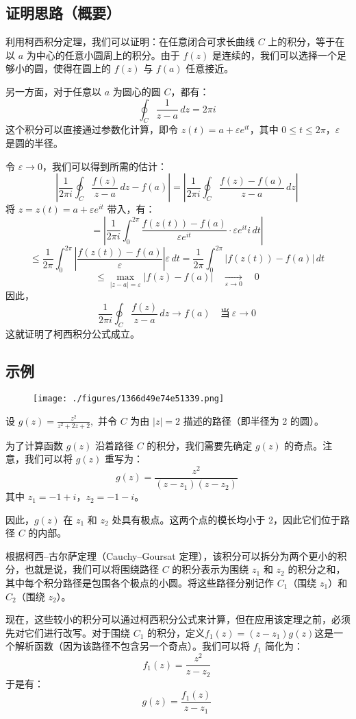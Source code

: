 \subsection{证明思路（概要）}
利用柯西积分定理，我们可以证明：在任意闭合可求长曲线 $C$ 上的积分，等于在以 $a$ 为中心的任意小圆周上的积分。由于 $f(z)$ 是连续的，我们可以选择一个足够小的圆，使得在圆上的 $f(z)$ 与 $f(a)$ 任意接近。

另一方面，对于任意以 $a$ 为圆心的圆 $C$，都有：
$$
\oint_{C} \frac{1}{z - a} \, dz = 2\pi i~
$$
这个积分可以直接通过参数化计算，即令 $z(t) = a + \varepsilon e^{it}$，其中 $0 \leq t \leq 2\pi$，$\varepsilon$ 是圆的半径。

令 $\varepsilon \to 0$，我们可以得到所需的估计：
$$
\left| \frac{1}{2\pi i} \oint_{C} \frac{f(z)}{z - a} \, dz - f(a) \right|
= \left| \frac{1}{2\pi i} \oint_{C} \frac{f(z) - f(a)}{z - a} \, dz \right|~
$$
将 $z = z(t) = a + \varepsilon e^{it}$ 带入，有：
$$
= \left| \frac{1}{2\pi i} \int_0^{2\pi} \frac{f(z(t)) - f(a)}{\varepsilon e^{it}} \cdot \varepsilon e^{it} i \, dt \right|~
$$
$$
\leq \frac{1}{2\pi} \int_0^{2\pi} \left| \frac{f(z(t)) - f(a)}{\varepsilon} \right| \varepsilon \, dt
= \frac{1}{2\pi} \int_0^{2\pi} |f(z(t)) - f(a)| \, dt~
$$
$$
\leq \max_{|z - a| = \varepsilon} |f(z) - f(a)| \quad \xrightarrow[\varepsilon \to 0]{} \quad 0~
$$
因此，
$$
\frac{1}{2\pi i} \oint_{C} \frac{f(z)}{z - a} \, dz \to f(a) \quad \text{当}~ \varepsilon \to 0~
$$
这就证明了柯西积分公式成立。
\subsection{示例}
\begin{figure}[ht]
\centering
\texttt{[image: ./figures/1366d49e74e51339.png]}
\caption{} \label{fig_KXjfgs_1}
\end{figure}
设
$g(z) = \frac{z^2}{z^2 + 2z + 2},$
并令 $C$ 为由 $|z| = 2$ 描述的路径（即半径为 2 的圆）。

为了计算函数 $g(z)$ 沿着路径 $C$ 的积分，我们需要先确定 $g(z)$ 的奇点。注意，我们可以将 $g(z)$ 重写为：
$$
g(z) = \frac{z^2}{(z - z_1)(z - z_2)}~
$$
其中 $z_1 = -1 + i$，$z_2 = -1 - i$。

因此，$g(z)$ 在 $z_1$ 和 $z_2$ 处具有极点。这两个点的模长均小于 2，因此它们位于路径 $C$ 的内部。

根据柯西–古尔萨定理（Cauchy–Goursat 定理），该积分可以拆分为两个更小的积分，也就是说，我们可以将围绕路径 $C$ 的积分表示为围绕 $z_1$ 和 $z_2$ 的积分之和，其中每个积分路径是包围各个极点的小圆。将这些路径分别记作 $C_1$（围绕 $z_1$）和 $C_2$（围绕 $z_2$）。

现在，这些较小的积分可以通过柯西积分公式来计算，但在应用该定理之前，必须先对它们进行改写。对于围绕 $C_1$ 的积分，定义$ f_1(z) = (z - z_1)g(z)$这是一个解析函数（因为该路径不包含另一个奇点）。我们可以将 $f_1$ 简化为：
$$
f_1(z) = \frac{z^2}{z - z_2}~
$$
于是有：
$$
g(z) = \frac{f_1(z)}{z - z_1}~
$$
